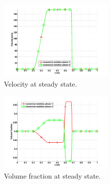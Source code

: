 \documentclass{anstrans}
\begin{document}
\begin{figure}[H]
                \centering
                \includegraphics[width=0.495\textwidth]{plots/relaxation_two_phases_velocity.png}
                \caption{Velocity at steady state.}
                \label{fig:velocity}
\end{figure}
\begin{figure}[H]
                \centering
                \includegraphics[width=0.495\textwidth]{plots/relaxation_two_phases_volume_fraction.png}
                \caption{Volume fraction at steady state.}
                \label{fig:volume_fraction}
\end{figure}
\end{document}
